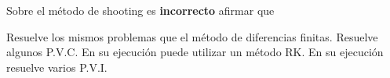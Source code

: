 \begin{pregunta}
\begin{cuerpo}
Sobre el m\'etodo de shooting es \textbf{incorrecto} afirmar que
\end{cuerpo}

\begin{multicols}{2}
\begin{alternativas}
{Resuelve los mismos problemas que el m\'etodo de diferencias finitas.}
{Resuelve algunos P.V.C.}
{En su ejecuci\'on puede utilizar un m\'etodo RK.}
{En su ejecuci\'on resuelve varios P.V.I.}
\end{alternativas}
\end{multicols}
\justificacion{0cm}
\end{pregunta}